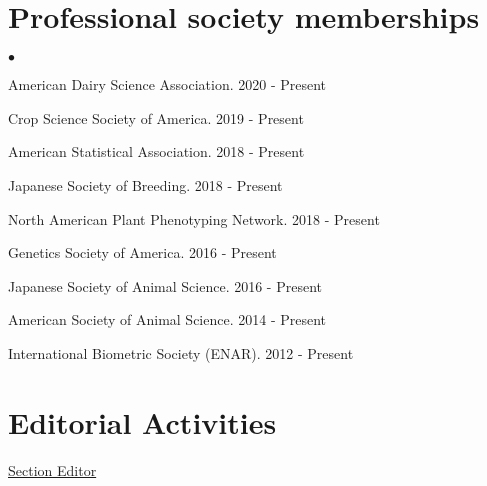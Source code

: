 \documentclass[margin,line,10pt]{res}
\newenvironment{list2}{
  \begin{list}{$\bullet$}{%
      \setlength{\itemsep}{0in}
      \setlength{\parsep}{0in} \setlength{\parskip}{0in}
      \setlength{\topsep}{0in} \setlength{\partopsep}{0in} 
      \setlength{\leftmargin}{0.2in}}}{\end{list}}
\begin{document}
\begin{resume}
\section{\sc Professional society memberships}
\begin{list2}
  \item American Dairy Science Association. 2020 - Present
    \vspace{0.3cm}
  \item Crop Science Society of America. 2019 - Present
    \vspace{0.3cm}
  \item American Statistical Association. 2018 - Present
    \vspace{0.3cm}
  \item  Japanese Society of Breeding. 2018 - Present
      \vspace{0.3cm}
\item North American Plant Phenotyping Network. 2018 - Present
  \vspace{0.3cm}
\item  Genetics Society of America. 2016 - Present
  \vspace{0.3cm}
\item  Japanese Society of Animal Science. 2016 - Present
  \vspace{0.3cm}
\item American Society of Animal Science. 2014 - Present
  \vspace{0.3cm}
\item International Biometric Society (ENAR). 2012 - Present
\end{list2}



\vspace{0.5cm}
\section{\sc Editorial Activities}


\underline{Section Editor}
\vspace{0.2cm}


\end{resume}
\end{document}
